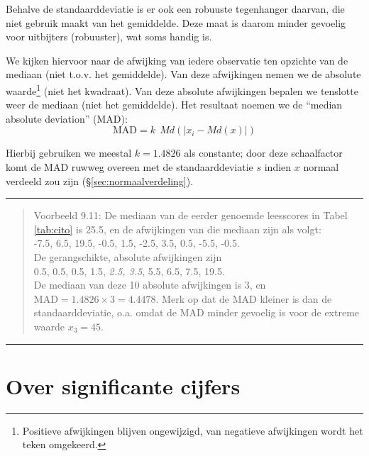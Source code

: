 \documentclass[
]{book}
\begin{document}
Behalve de standaarddeviatie is er ook een robuuste tegenhanger daarvan,
die niet gebruik maakt van het gemiddelde. Deze maat is daarom minder
gevoelig voor uitbijters (robuuster), wat soms handig is.

We kijken hiervoor naar de afwijking van iedere observatie ten opzichte
van de mediaan (niet t.o.v. het gemiddelde). Van deze afwijkingen nemen
we de absolute waarde\footnote{Positieve afwijkingen blijven ongewijzigd, van negatieve afwijkingen wordt het teken omgekeerd.} (niet het kwadraat). Van deze absolute
afwijkingen bepalen we tenslotte weer de mediaan (niet het gemiddelde).
Het resultaat noemen we de ``median absolute deviation'' (MAD):
\begin{equation}
  \textrm{MAD} = k ~~ Md ( |x_i - Md(x) |)
  \label{eq:MAD}
\end{equation}

Hierbij gebruiken we meestal \(k=1.4826\) als constante; door deze schaalfactor komt de MAD
ruwweg overeen met de standaarddeviatie \(s\) indien \(x\) normaal verdeeld
zou zijn (§\ref{sec:normaalverdeling}).

\begin{center}\rule{0.5\linewidth}{0.5pt}\end{center}

\begin{quote}
Voorbeeld 9.11:
De mediaan van de eerder genoemde leesscores in
Tabel \ref{tab:cito} is
25.5, en de afwijkingen van die mediaan zijn als volgt:\\
-7.5, 6.5, 19.5, -0.5, 1.5, -2.5, 3.5, 0.5, -5.5, -0.5.\\
De gerangschikte, absolute afwijkingen zijn\\
0.5, 0.5, 0.5, 1.5, \emph{2.5, 3.5}, 5.5, 6.5, 7.5, 19.5.\\
De mediaan van deze 10 absolute afwijkingen is 3, en
\(\textrm{MAD} = 1.4826 \times 3 = 4.4478\). Merk op dat de MAD kleiner is
dan de standaarddeviatie, o.a. omdat de MAD minder gevoelig is voor de
extreme waarde \(x_3=45\).
\end{quote}

\begin{center}\rule{0.5\linewidth}{0.5pt}\end{center}

\hypertarget{sec:significantecijfers}{%
\section{Over significante cijfers}\label{sec:significantecijfers}}
\end{document}
